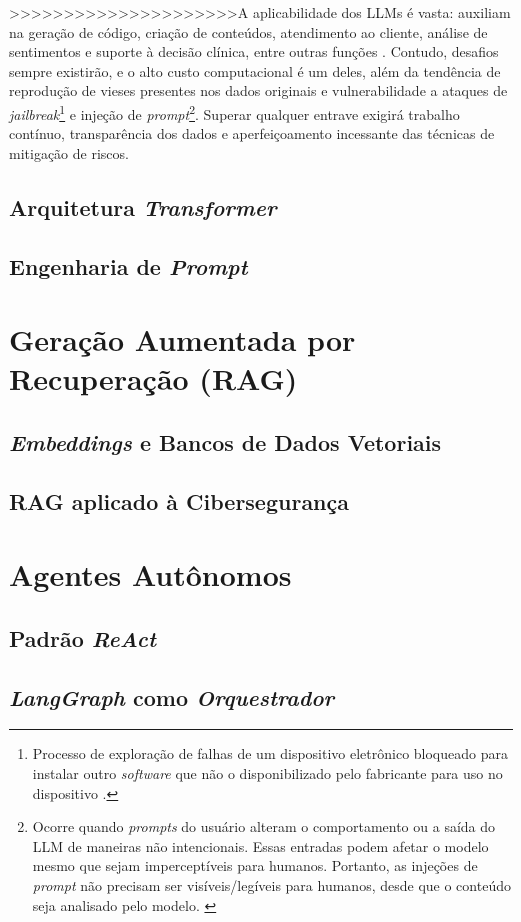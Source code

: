 >>>>>>>>>>>>>>>>>>>>>A aplicabilidade dos LLMs é vasta: auxiliam na geração de código, criação de conteúdos, atendimento ao cliente, análise de sentimentos e suporte à decisão clínica, entre outras funções \cite{motlagh2024llmcyber}. 
Contudo, desafios sempre existirão, e o alto custo computacional é um deles, além da tendência de reprodução de vieses presentes nos dados originais e vulnerabilidade a ataques de \textit{jailbreak}\footnote{Processo de exploração de falhas de um dispositivo eletrônico bloqueado para instalar outro \textit{software} que não o disponibilizado pelo fabricante para uso no dispositivo \cite{kaspersky2024jailbreaking}.}
e injeção de \textit{prompt}\footnote{Ocorre quando \textit{prompts} do usuário alteram o comportamento ou a saída do LLM de maneiras não intencionais. 
Essas entradas podem afetar o modelo mesmo que sejam imperceptíveis para humanos. Portanto, as injeções de \textit{prompt} não precisam ser visíveis/legíveis para humanos, desde que o conteúdo seja analisado pelo modelo. \cite{owasp2024promptinjection}}.
Superar qualquer entrave exigirá trabalho contínuo, transparência dos dados e aperfeiçoamento incessante das técnicas de mitigação de riscos. 


\subsection{Arquitetura \textit{Transformer}}



\subsection{Engenharia de \textit{Prompt}}



\section{Geração Aumentada por Recuperação (RAG)}



\subsection{\textit{Embeddings} e Bancos de Dados Vetoriais}



\subsection{RAG aplicado à Cibersegurança}



\section{Agentes Autônomos}



\subsection{Padrão \textit{ReAct}}



\subsection{\textit{LangGraph} como \textit{Orquestrador}}